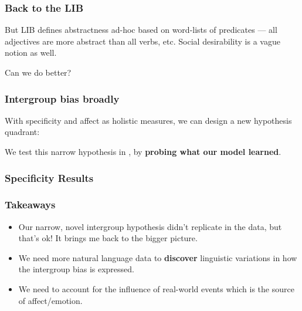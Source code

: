\begin{frame}[c]\frametitle{Back to the LIB}
    
    
    \pause\vfill
    
    But LIB defines abstractness ad-hoc based on word-lists of predicates --- all adjectives are more abstract than all verbs, etc. Social desirability is a vague notion as well. 
    
    \vfill
    
    Can we do better?

\end{frame}


\begin{frame}[c]\frametitle{Intergroup bias broadly}

   With specificity and affect as holistic measures, we can design a new hypothesis quadrant:
    
    \vfill
    
    
    \vfill\pause
    
    We test this narrow hypothesis in \textcolor{AmmaBlue}{\cite{govindarajan-etal-2023-counterfactual}}, by \textbf{probing what our model learned}.
\end{frame}


% 
%         
% 

\begin{frame}[c]\frametitle{Specificity Results}

    \begin{figure}
        \centering
        
        \label{fig:specificity}
    \end{figure}

\end{frame}

\begin{frame}[c]\frametitle{Takeaways}

\begin{itemize}
    \itemsep=\baselineskip
    \item Our narrow, novel intergroup hypothesis didn't replicate in the data, but that's ok! It brings me back to the bigger picture.\pause
    \item We need more natural language data to \textbf{discover} linguistic variations in how the intergroup bias is expressed.\pause
    \item We need to account for the influence of real-world events which is the source of affect/emotion.
\end{itemize}


\end{frame}
